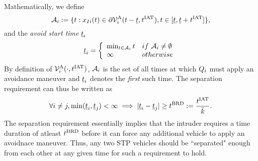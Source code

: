 Mathematically, we define
\begin{equation} \label{eqn:avoidStartTime}
\avoidt_{i} := \{t: \state_{\intr i}(t) \in \partial\brs^{\text{A}}_{i}(t-\tsa, \iat), t \in [\tsa, \tsa+\iat]\},
\end{equation}
and the \textit{avoid start time} $\underline{t}_i$
\begin{equation} \label{eqn:avoidStartTime2}
\tsa_i  = 
\left \{ 
\begin{array}{ll}
\min_{t \in  \avoidt_{i}} t & \mbox{if~} \avoidt_{i} \neq \emptyset\\
\infty & \mbox{otherwise}
\end{array}
\right.
\end{equation}  
By definition of $\mathcal{V}^{\text{A}}_{i}(\cdot, t^\text{IAT})$, $\mathcal{A}_{i}$ is the set of all times at which $Q_i$ must apply an avoidance maneuver and $\underline{t}_i$ denotes the \textit{first} such time. The separation requirement can thus be written as
\begin{equation} \label{eqn:sep_cond}
\forall i \neq j, \min(\tsa_i, \tsa_j)< \infty \implies |\tsa_i - \tsa_j| \geq \brd := \frac{\iat}{\nva}.
\end{equation}
The separation requirement essentially implies that the intruder requires a time duration of atleast $t^\text{BRD}$ before it can force any additional vehicle to apply an avoidnace maneuver. Thus, any two STP vehicles should be ``separated" enough from each other at any given time for such a requirement to hold. 
%
%
